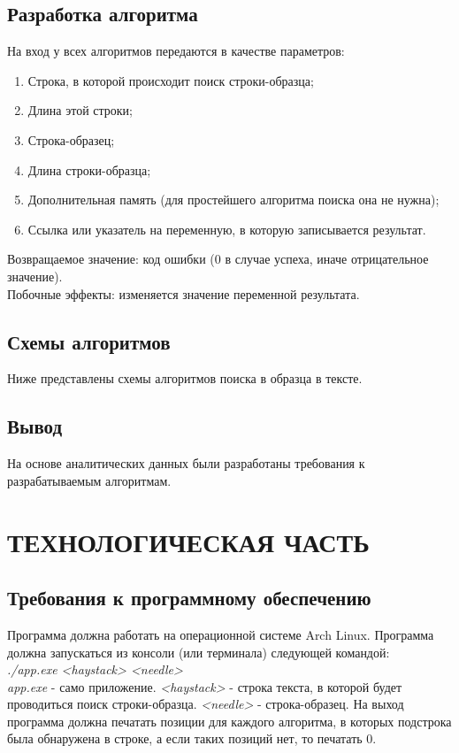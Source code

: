 \documentclass[a4paper,12pt]{article}
\begin{document}
\subsection{Разработка алгоритма}
На вход у всех алгоритмов передаются в качестве параметров:
\begin{enumerate}
\item Строка, в которой происходит поиск строки-образца;
\item Длина этой строки; 
\item Строка-образец;
\item Длина строки-образца;
\item Дополнительная память (для простейшего алгоритма поиска она не нужна);
\item Ссылка или указатель на переменную, в которую записывается результат.
\end{enumerate}
Возвращаемое значение: код ошибки (0 в случае успеха, иначе отрицательное значение). \\
Побочные эффекты: изменяется значение переменной результата.

\newpage
\subsection{Схемы алгоритмов}
Ниже представлены схемы алгоритмов поиска в образца в тексте.

\newpage
\subsection{Вывод}
На основе аналитических данных были разработаны требования к разрабатываемым алгоритмам.


\newpage
\section{ТЕХНОЛОГИЧЕСКАЯ ЧАСТЬ}
\subsection{Требования к программному обеспечению}
Программа должна работать на операционной системе Arch Linux. 
Программа должна запускаться из консоли (или терминала) следующей командой:\\
\textit{./app.exe <haystack> <needle>} \\
\textit{app.exe} - само приложение. \textit{<haystack>} - строка текста, в которой будет проводиться поиск строки-образца. \textit{<needle>} - строка-образец.
На выход программа должна печатать позиции для каждого алгоритма, в которых подстрока была обнаружена в строке, а если таких позиций нет, то печатать 0.
\end{document}
